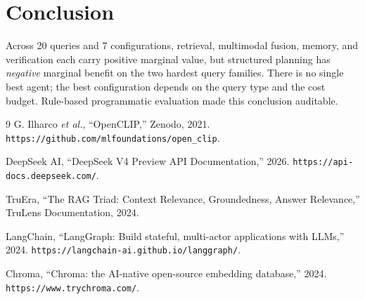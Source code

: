 \documentclass[sigconf, nonacm=true, anonymous=false]{acmart}
\begin{document}
\section{Conclusion}
\label{sec:conclusion}

Across 20 queries and 7 configurations, retrieval, multimodal fusion,
memory, and verification each carry positive marginal value, but
structured planning has \emph{negative} marginal benefit on the two
hardest query families. There is no single best agent; the best
configuration depends on the query type and the cost budget.
Rule-based programmatic evaluation made this conclusion auditable.

\begin{thebibliography}{9}
G. Ilharco \emph{et al.},
``OpenCLIP,'' Zenodo, 2021. \texttt{https://github.com/mlfoundations/open\_clip}.

DeepSeek AI,
``DeepSeek V4 Preview API Documentation,'' 2026.
\texttt{https://api-docs.deepseek.com/}.

TruEra,
``The RAG Triad: Context Relevance, Groundedness, Answer Relevance,''
TruLens Documentation, 2024.

LangChain,
``LangGraph: Build stateful, multi-actor applications with LLMs,'' 2024.
\texttt{https://langchain-ai.github.io/langgraph/}.

Chroma,
``Chroma: the AI-native open-source embedding database,'' 2024.
\texttt{https://www.trychroma.com/}.
\end{thebibliography}
\end{document}
